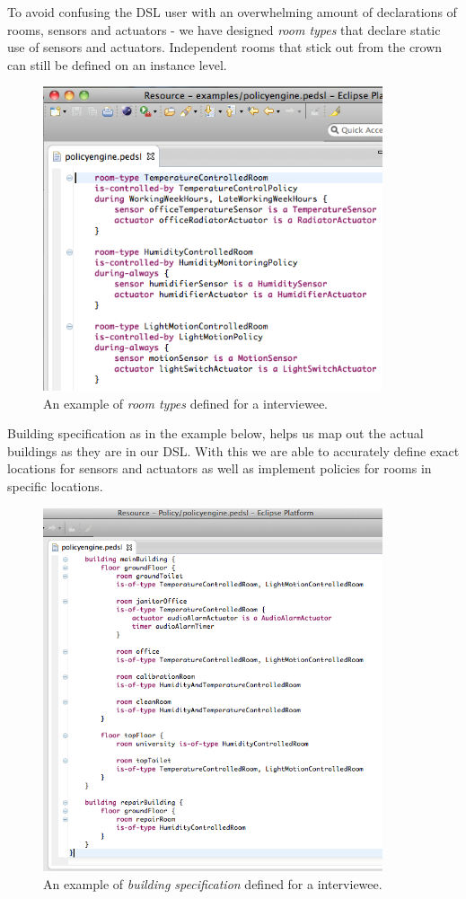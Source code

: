 \documentclass{llncs}
\begin{document}
To avoid confusing the DSL user with an overwhelming amount of declarations of rooms, sensors and actuators - we have designed \textit{room types} that declare static use of sensors and actuators. Independent rooms that stick out from the crown can still be defined on an instance level.

\begin{figure}
  \centering
    \includegraphics[width=10cm]{dsl-room-types.png}
	\caption{An example of \textit{room types} defined for a interviewee.}
	\label{fig:room-types}
\end{figure}

\newpage
Building specification as in the example below, helps us map out the actual buildings as they are in our DSL. With this we are able to accurately define exact locations for sensors and actuators as well as implement policies for rooms in specific locations. 

\begin{figure}
  \centering
	 \includegraphics[width=10cm]{dsl-building-definition.png}  
	\caption{An example of \textit{building specification} defined for a interviewee.}
	\label{fig:dsl-building-definition}
\end{figure}
\end{document}
